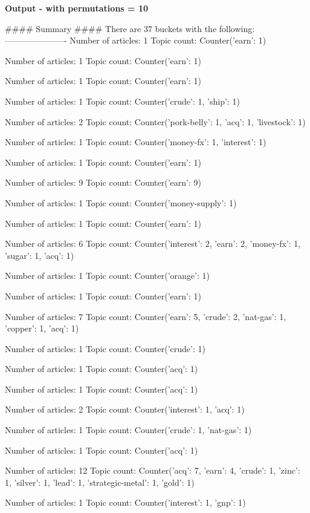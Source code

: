 \documentclass{article}
\begin{document}
\textbf{Output - with permutations = 10}\\
\begin{pythonOutput}
#### Summary ####
There are 37 buckets with the following:
----------------------
Number of articles: 1
Topic count: Counter({'earn': 1})

Number of articles: 1
Topic count: Counter({'earn': 1})

Number of articles: 1
Topic count: Counter({'earn': 1})

Number of articles: 1
Topic count: Counter({'crude': 1, 'ship': 1})

Number of articles: 2
Topic count: Counter({'pork-belly': 1, 'acq': 1, 'livestock': 1})

Number of articles: 1
Topic count: Counter({'money-fx': 1, 'interest': 1})

Number of articles: 1
Topic count: Counter({'earn': 1})

Number of articles: 9
Topic count: Counter({'earn': 9})

Number of articles: 1
Topic count: Counter({'money-supply': 1})

Number of articles: 1
Topic count: Counter({'earn': 1})

Number of articles: 6
Topic count: Counter({'interest': 2, 'earn': 2, 'money-fx': 1, 'sugar': 1, 'acq': 1})

Number of articles: 1
Topic count: Counter({'orange': 1})

Number of articles: 1
Topic count: Counter({'earn': 1})

Number of articles: 7
Topic count: Counter({'earn': 5, 'crude': 2, 'nat-gas': 1, 'copper': 1, 'acq': 1})

Number of articles: 1
Topic count: Counter({'crude': 1})

Number of articles: 1
Topic count: Counter({'acq': 1})

Number of articles: 1
Topic count: Counter({'acq': 1})

Number of articles: 2
Topic count: Counter({'interest': 1, 'acq': 1})

Number of articles: 1
Topic count: Counter({'crude': 1, 'nat-gas': 1})

Number of articles: 1
Topic count: Counter({'acq': 1})

Number of articles: 12
Topic count: Counter({'acq': 7, 'earn': 4, 'crude': 1, 'zinc': 1, 'silver': 1, 'lead': 1, 'strategic-metal': 1, 'gold': 1})

Number of articles: 1
Topic count: Counter({'interest': 1, 'gnp': 1})


\end{pythonOutput}
\end{document}
